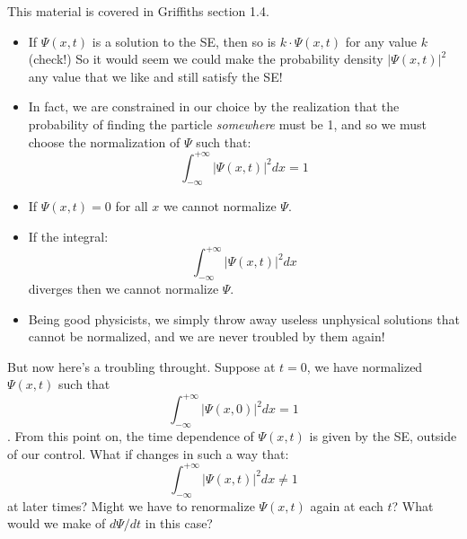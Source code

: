 \documentclass[12pt]{book}
\begin{document}
This material is covered in Griffiths section 1.4.  
\begin{itemize}
 \item If $\Psi(x,t)$ is a solution to the SE, then so is $k \cdot \Psi(x,t)$ for any value $k$ (check!)  So it would seem we could make the probability density $|\Psi(x,t)|^2$ any value that we like and still satisfy the SE!  
 \item In fact, we are constrained in our choice by the realization that the probability of finding the particle {\em somewhere} must be 1, and so we must choose the normalization of $\Psi$ such that:
\begin{equation}
\label{eqn:norm}
\int_{-\infty}^{+\infty} |\Psi(x,t)|^2 dx = 1
\end{equation}

\item If $\Psi(x,t)=0$ for all $x$ we cannot normalize $\Psi$.
 \item If the integral:
$$\int_{-\infty}^{+\infty} |\Psi(x,t)|^2 dx$$
diverges then we cannot normalize $\Psi$.
\item Being good physicists, we simply throw away useless unphysical solutions that cannot be normalized, and we are never troubled by them again! 
\end{itemize}

But now here's a troubling throught.  Suppose at $t=0$, we have normalized $\Psi(x,t)$ such that
$$\int_{-\infty}^{+\infty} |\Psi(x,0)|^2 dx = 1$$.  
From this point on, the time dependence of $\Psi(x,t)$ is given by the SE, outside of our control.  What if changes in such a way that:
$$\int_{-\infty}^{+\infty} |\Psi(x,t)|^2 dx \neq 1$$ 
at later times?  Might we have to renormalize $\Psi(x,t)$ again at each $t$?  What would we make of $d\Psi/dt$ in this case?
\end{document}
